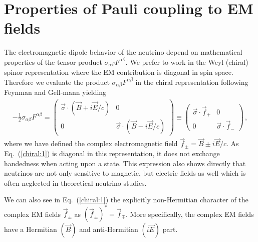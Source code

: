 \documentclass[addchapnum]{ws-rv961x669} %
\newcommand{\req}[1]{Eq.~(\ref{#1})}
\begin{document}
\section{Properties of Pauli coupling to EM fields}
\label{sec:numoment}
The electromagnetic dipole behavior of the neutrino depend on mathematical properties of the tensor product $\sigma_{\alpha\beta}F^{\alpha\beta}$. We prefer to work in the Weyl (chiral) spinor representation where the EM contribution is diagonal in spin space. Therefore we evaluate the product $\sigma_{\alpha\beta}F^{\alpha\beta}$ in the chiral representation following Feynman and Gell-mann\cite{Feynman:1958ty} yielding
\begin{align}
    \label{chiral:1}
    -\frac{1}{2}\sigma_{\alpha\beta}F^{\alpha\beta}=
    \begin{pmatrix}
        \vec{\sigma}\cdot(\vec{B}+i\vec{E}/c) & 0\\
        0 & \vec{\sigma}\cdot(\vec{B}-i\vec{E}/c)
    \end{pmatrix}\equiv
    \begin{pmatrix}
        \vec{\sigma}\cdot\vec{f}_{+} & 0 \\
        0 & \vec{\sigma}\cdot\vec{f}_{-}
    \end{pmatrix}\,,
\end{align}
where we have defined the complex electromagnetic field $\vec{f}_{\pm}=\vec{B}\pm i\vec{E}/c$. As \req{chiral:1} is diagonal in this representation, it does not exchange handedness when acting upon a state. This expression also shows directly that neutrinos are not only sensitive to magnetic, but electric fields as well which is often neglected in theoretical neutrino studies.

We can also see in \req{chiral:1} the explicitly non-Hermitian character of the complex EM fields $\vec{f}_{\pm}$ as $(\vec{f}_{\pm})^{*}=\vec{f}_{\mp}$. More specifically, the complex EM fields have a Hermitian $(\vec{B})$ and anti-Hermitian $(i\vec{E})$ part.
\end{document}
